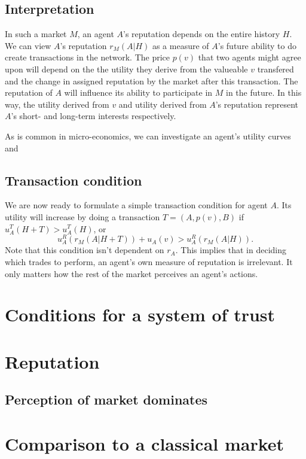\subsection{Interpretation}
In such a market $M$, an agent $A$'s reputation depends on the entire history $H$. We can view $A$'s reputation $r_M(A|H)$ as a measure of $A$'s future ability to do create transactions in the network. The price $p(v)$ that two agents might agree upon will depend on the the utility they derive from the valueable $v$ transfered and the change in assigned reputation by the market after this transaction. The reputation of $A$ will influence its ability to participate in $M$ in the future. In this way, the utility derived from $v$ and utility derived from $A$'s reputation represent $A$'s short- and long-term interests respectively.

As is common in micro-economics, we can investigate an agent's utility curves and 

\subsection{Transaction condition}
We are now ready to formulate a simple transaction condition for agent $A$. Its utility will increase by doing a transaction $T = (A, p(v), B)$ if $u^T_A(H + T) > u^T_A(H)$, or
\[u^R_A(r_M(A|H + T)) + u_A(v) > u^R_A(r_M(A|H)).\]
Note that this condition isn't dependent on $r_A$. This implies that in deciding which trades to perform, an agent's own measure of reputation is irrelevant. It only matters how the rest of the market perceives an agent's actions.


\section{Conditions for a system of trust}

\section{Reputation}
\subsection{Perception of market dominates}

\section{Comparison to a classical market}

